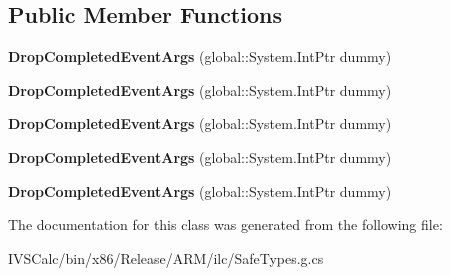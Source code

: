 \subsection*{Public Member Functions}
\begin{DoxyCompactItemize}
\item 
\mbox{\label{class_windows_1_1_u_i_1_1_xaml_1_1_drop_completed_event_args_a8dedef19f7147b2eea4f988b2dcb33ae}} 
{\bfseries Drop\+Completed\+Event\+Args} (global\+::\+System.\+Int\+Ptr dummy)
\item 
\mbox{\label{class_windows_1_1_u_i_1_1_xaml_1_1_drop_completed_event_args_a8dedef19f7147b2eea4f988b2dcb33ae}} 
{\bfseries Drop\+Completed\+Event\+Args} (global\+::\+System.\+Int\+Ptr dummy)
\item 
\mbox{\label{class_windows_1_1_u_i_1_1_xaml_1_1_drop_completed_event_args_a8dedef19f7147b2eea4f988b2dcb33ae}} 
{\bfseries Drop\+Completed\+Event\+Args} (global\+::\+System.\+Int\+Ptr dummy)
\item 
\mbox{\label{class_windows_1_1_u_i_1_1_xaml_1_1_drop_completed_event_args_a8dedef19f7147b2eea4f988b2dcb33ae}} 
{\bfseries Drop\+Completed\+Event\+Args} (global\+::\+System.\+Int\+Ptr dummy)
\item 
\mbox{\label{class_windows_1_1_u_i_1_1_xaml_1_1_drop_completed_event_args_a8dedef19f7147b2eea4f988b2dcb33ae}} 
{\bfseries Drop\+Completed\+Event\+Args} (global\+::\+System.\+Int\+Ptr dummy)
\end{DoxyCompactItemize}


The documentation for this class was generated from the following file\+:\begin{DoxyCompactItemize}
\item 
I\+V\+S\+Calc/bin/x86/\+Release/\+A\+R\+M/ilc/Safe\+Types.\+g.\+cs\end{DoxyCompactItemize}
